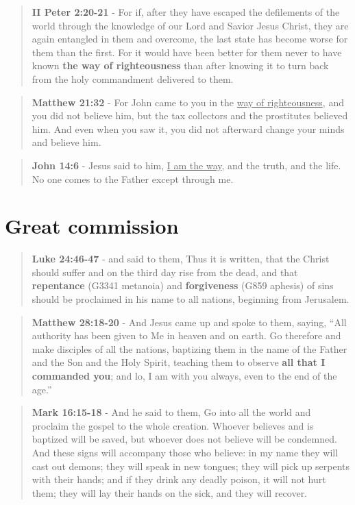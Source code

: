 \documentclass[11pt]{article}
\begin{document}
\begin{quote}
\textbf{II Peter 2:20-21} - For if, after they have escaped the defilements of the world through the knowledge of our Lord and Savior Jesus Christ, they are again entangled in them and overcome, the last state has become worse for them than the first. For it would have been better for them never to have known \textbf{the way of righteousness} than after knowing it to turn back from the holy commandment delivered to them.
\end{quote}

\begin{quote}
\textbf{Matthew 21:32} - For John came to you in the \uline{way of righteousness}, and you did not believe him, but the tax collectors and the prostitutes believed him. And even when you saw it, you did not afterward change your minds and believe him.
\end{quote}

\begin{quote}
\textbf{John 14:6} - Jesus said to him, \uline{I am the way}, and the truth, and the life. No one comes to the Father except through me.
\end{quote}

\section{Great commission}
\label{sec:org4c26dcd}
\begin{quote}
\textbf{Luke 24:46-47} - and said to them, Thus it is written, that the Christ should suffer and on the third day rise from the dead, and that \textbf{repentance} (G3341 metanoia) and \textbf{forgiveness} (G859 aphesis) of sins should be proclaimed in his name to all nations, beginning from Jerusalem.
\end{quote}

\begin{quote}
\textbf{Matthew 28:18-20} - And Jesus came up and spoke to them, saying, “All authority has been given to Me in heaven and on earth. Go therefore and make disciples of all the nations, baptizing them in the name of the Father and the Son and the Holy Spirit, teaching them to observe \textbf{all that I commanded you}; and lo, I am with you always, even to the end of the age.”
\end{quote}

\begin{quote}
\textbf{Mark 16:15-18} - And he said to them, Go into all the world and proclaim the gospel to the whole creation. Whoever believes and is baptized will be saved, but whoever does not believe will be condemned. And these signs will accompany those who believe: in my name they will cast out demons; they will speak in new tongues; they will pick up serpents with their hands; and if they drink any deadly poison, it will not hurt them; they will lay their hands on the sick, and they will recover.
\end{quote}
\end{document}
